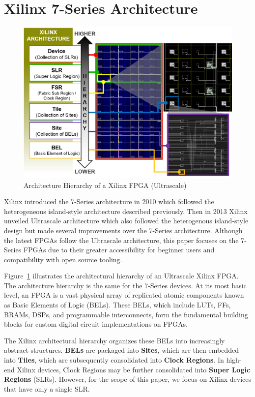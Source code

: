 \documentclass[twocolumn]{article}
\begin{document}
\section{Xilinx 7-Series Architecture}

    \begin{figure}[t]
        \centering
        \includegraphics[width=12.0cm]{figures/hierarchy.png}
        \caption{Architecture Hierarchy of a Xilinx FPGA (Ultrascale)}
        \label{fig:hierarchy}
    \end{figure}

    Xilinx introduced the 7-Series architecture in 2010 which followed the heterogeneous island-style architecture described previously. 
    Then in 2013 Xilinx unveiled Ultrascale architecture which also followed the heterogenous island-style design but made several improvements over the 7-Series architecture.
    Although the latest FPGAs follow the Ultrascale architecture, this paper focuses on the 7-Series FPGAs due to their greater accessibility for beginner users and compatibility with open source tooling.


    Figure~\ref{fig:hierarchy} illustrates the architectural hierarchy of an Ultrascale Xilinx FPGA. 
    The architecture hierarchy is the same for the 7-Series devices. 
    At its most basic level, an FPGA is a vast physical array of replicated atomic components known as Basic Elements of Logic (BELs). 
    These BELs, which include LUTs, FFs, BRAMs, DSPs, and programmable interconnects, form the fundamental building blocks for custom digital circuit implementations on FPGAs. 

    The Xilinx architectural hierarchy organizes these BELs into increasingly abstract structures. 
    \textbf{BELs} are packaged into \textbf{Sites}, which are then embedded into \textbf{Tiles}, which are subsequently consolidated into \textbf{Clock Regions}. 
    In high-end Xilinx devices, Clock Regions may be further consolidated into \textbf{Super Logic Regions} (SLRs). 
    However, for the scope of this paper, we focus on Xilinx devices that have only a single SLR. 
\end{document}

